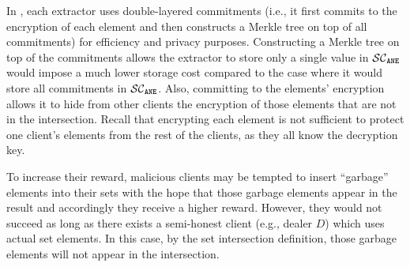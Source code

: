%







In \epsi, each extractor uses double-layered commitments (i.e., it first commits to the encryption of each element and then constructs a Merkle tree on top of all commitments) for efficiency and privacy purposes. Constructing a Merkle tree on top of the commitments allows the extractor to store only a single value in $\mathcal{SC}_{\mathtt{ANE}}$ would impose a much lower storage cost compared to the case where it would store all commitments in $\mathcal{SC}_{\mathtt{ANE}}$. Also, committing to the elements' encryption allows it to hide from other clients the encryption of those elements that are not in the intersection. Recall that encrypting each element is not sufficient to protect one client's elements from the rest of the clients, as they all know the decryption key. 


To increase their reward, malicious clients may be tempted to insert ``garbage'' elements into their sets with the hope that those garbage elements appear in the result and accordingly they receive a higher reward. However, they would not succeed as long as there exists a semi-honest client (e.g., dealer $D$) which uses actual set elements. In this case, by the set intersection definition, those garbage elements will not appear in the intersection. 



